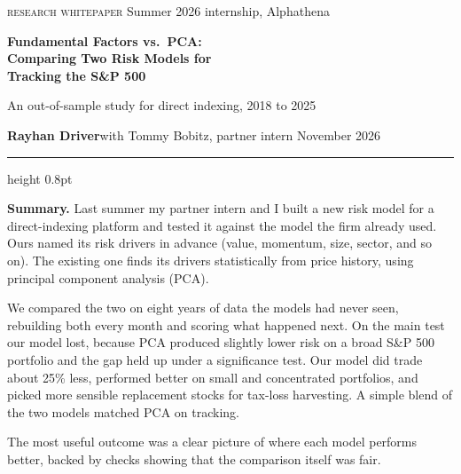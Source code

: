 \documentclass[11pt,letterpaper]{article}
\begin{document}
\thispagestyle{first}

{\footnotesize\color{accent}\textsc{\MakeLowercase{Research whitepaper}}\hfill
 \color{muted}Summer 2026 internship, Alphathena}

\vspace{0.9em}
{\fontsize{22}{27}\selectfont\bfseries Fundamental Factors vs.\ PCA:\\[1pt] Comparing Two Risk Models for\\[1pt] Tracking the S\&P 500\par}

\vspace{0.7em}
{\large\color{muted} An out-of-sample study for direct indexing, 2018 to 2025\par}

\vspace{1.1em}
{\small \textbf{Rayhan Driver}\quad\textcolor{muted}{with Tommy Bobitz, partner intern}\hfill
 \textcolor{muted}{November 2026}}

\vspace{0.5em}
{\color{rule}\hrule height 0.8pt}
\vspace{1.0em}

\begin{takeaway}
\textbf{Summary.} Last summer my partner intern and I built a new risk model for a
direct-indexing platform and tested it against the model the firm already used. Ours named
its risk drivers in advance (value, momentum, size, sector, and so on). The existing one
finds its drivers statistically from price history, using principal component analysis (PCA).

We compared the two on eight years of data the models had never seen, rebuilding both every
month and scoring what happened next. On the main test our model lost, because PCA produced
slightly lower risk on a broad S\&P 500 portfolio and the gap held up under a significance
test. Our model did trade about 25\% less, performed better on small and concentrated
portfolios, and picked more sensible replacement stocks for tax-loss harvesting. A simple
blend of the two models matched PCA on tracking.

The most useful outcome was a clear picture of where each model performs better, backed by
checks showing that the comparison itself was fair.
\end{takeaway}
\end{document}
